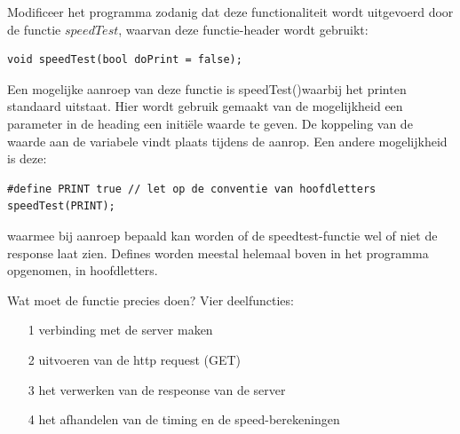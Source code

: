 \begin{exercise}
Modificeer het programma zodanig dat deze functionaliteit wordt uitgevoerd door de functie $speedTest$, waarvan deze functie-header wordt gebruikt:

\begin{lstlisting}[language=Arduino, numbers=none]
void speedTest(bool doPrint = false);
\end{lstlisting}
Een mogelijke aanroep van deze functie is speedTest()waarbij het printen standaard uitstaat. Hier wordt gebruik gemaakt van de mogelijkheid een parameter in de heading een initiële waarde te geven. De koppeling van de waarde aan de variabele vindt plaats tijdens de aanrop. Een andere mogelijkheid is deze:
\begin{lstlisting}[language=Arduino, numbers=none]
#define PRINT true // let op de conventie van hoofdletters 
speedTest(PRINT);
\end{lstlisting}
waarmee bij aanroep bepaald kan worden of de speedtest-functie wel of niet de response laat zien. Defines worden meestal helemaal boven in het programma opgenomen, in hoofdletters.\newline 

Wat moet de functie precies doen? Vier deelfuncties: 
\begin{enumerate}
  \item[1] verbinding met de server maken
  \item[2] uitvoeren van de http request (GET)
  \item[3] het verwerken van de respeonse van de server
  \item[4] het afhandelen van de timing en de speed-berekeningen
\end{enumerate}
\end{exercise}

